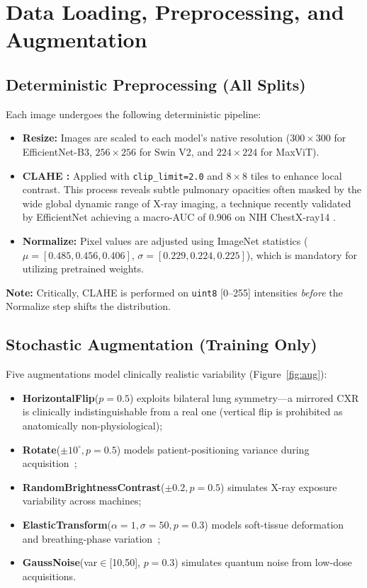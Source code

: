 \documentclass[11pt,a4paper]{article}
\begin{document}
\section{Data Loading, Preprocessing, and Augmentation}

\subsection{Deterministic Preprocessing (All Splits)}

Each image undergoes the following deterministic pipeline:
\begin{itemize}
    \item \textbf{Resize:} Images are scaled to each model's native resolution ($300 \times 300$ for EfficientNet-B3, $256 \times 256$ for Swin V2, and $224 \times 224$ for MaxViT).
    \item \textbf{CLAHE \cite{rajpurkar2017}:} Applied with \texttt{clip\_limit=2.0} and $8 \times 8$ tiles to enhance local contrast. This process reveals subtle pulmonary opacities often masked by the wide global dynamic range of X-ray imaging, a technique recently validated by EfficientNet achieving a macro-AUC of 0.906 on NIH ChestX-ray14 \cite{sawah2026}.
    \item \textbf{Normalize:} Pixel values are adjusted using ImageNet statistics ($\mu = [0.485, 0.456, 0.406]$, $\sigma = [0.229, 0.224, 0.225]$), which is mandatory for utilizing pretrained weights.
\end{itemize}

\noindent \textbf{Note:} Critically, CLAHE is performed on \texttt{uint8} [0--255] intensities \textit{before} the Normalize step shifts the distribution.

\subsection{Stochastic Augmentation (Training Only)}

Five augmentations model clinically realistic variability (Figure~\ref{fig:aug}):
\begin{itemize}
    \item \textbf{HorizontalFlip}($p\!=\!0.5$) exploits bilateral lung symmetry---a mirrored CXR is clinically indistinguishable from a real one (vertical flip is prohibited as anatomically non-physiological); 
    \item \textbf{Rotate}($\pm10^\circ, p\!=\!0.5$) models patient-positioning variance during acquisition~\cite{castro2020}; 
    \item \textbf{RandomBrightnessContrast}($\pm0.2, p\!=\!0.5$) simulates X-ray exposure variability across machines; 
    \item \textbf{ElasticTransform}($\alpha\!=\!1, \sigma\!=\!50, p\!=\!0.3$) models soft-tissue deformation and breathing-phase variation~\cite{garcea2023}; 
    \item \textbf{GaussNoise}(var$\in$[10,50], $p\!=\!0.3$) simulates quantum noise from low-dose acquisitions.
\end{itemize}
\end{document}
